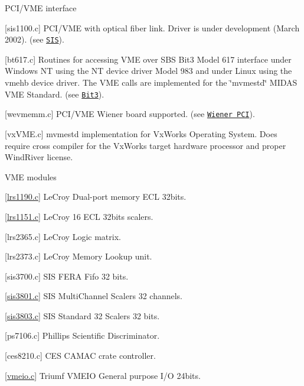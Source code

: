 \begin{DoxyItemize}
\item PCI/VME interface
\begin{DoxyItemize}
\item {\bfseries }\mbox{[}sis1100.c\mbox{]} PCI/VME with optical fiber link. Driver is under development (March 2002). (see \href{http://www.sruck.de/vme.htm}{\tt SIS}).
\item {\bfseries }\mbox{[}bt617.c\mbox{]} Routines for accessing VME over SBS Bit3 Model 617 interface under Windows NT using the NT device driver Model 983 and under Linux using the vmehb device driver. The VME calls are implemented for the \char`\"{}mvmestd\char`\"{} MIDAS VME Standard. (see \href{http://www.sbs.com/computer/products/cp_adapters.shtml}{\tt Bit3}).
\item {\bfseries }\mbox{[}wevmemm.c\mbox{]} PCI/VME Wiener board supported. (see \href{http://www.wiener-d.com/vmepci.htm}{\tt Wiener PCI}).
\item \mbox{[}vxVME.c\mbox{]} mvmestd implementation for VxWorks Operating System. Does require cross compiler for the VxWorks target hardware processor and proper WindRiver license.
\end{DoxyItemize}
\end{DoxyItemize}


\begin{DoxyItemize}
\item VME modules
\begin{DoxyItemize}
\item {\bfseries }\mbox{[}\hyperlink{lrs1190_8c}{lrs1190.c}\mbox{]} LeCroy Dual-\/port memory ECL 32bits.
\item {\bfseries }\mbox{[}\hyperlink{lrs1151_8c}{lrs1151.c}\mbox{]} LeCroy 16 ECL 32bits scalers.
\item {\bfseries }\mbox{[}lrs2365.c\mbox{]} LeCroy Logic matrix.
\item {\bfseries }\mbox{[}lrs2373.c\mbox{]} LeCroy Memory Lookup unit.
\item {\bfseries }\mbox{[}sis3700.c\mbox{]} SIS FERA Fifo 32 bits.
\item {\bfseries }\mbox{[}\hyperlink{sis3801_8c}{sis3801.c}\mbox{]} SIS MultiChannel Scalers 32 channels.
\item {\bfseries }\mbox{[}\hyperlink{sis3803_8c}{sis3803.c}\mbox{]} SIS Standard 32 Scalers 32 bits.
\item {\bfseries }\mbox{[}ps7106.c\mbox{]} Phillips Scientific Discriminator.
\item {\bfseries }\mbox{[}ces8210.c\mbox{]} CES CAMAC crate controller.
\item {\bfseries }\mbox{[}\hyperlink{vmeio_8c}{vmeio.c}\mbox{]} Triumf VMEIO General purpose I/O 24bits.
\end{DoxyItemize}
\end{DoxyItemize}

